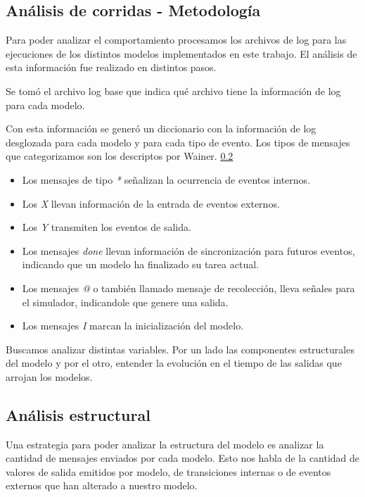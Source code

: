 
\subsection{Análisis de corridas - Metodología}

Para poder analizar el comportamiento procesamos los archivos de log para las ejecuciones de los distintos modelos implementados en este trabajo.
El análisis de esta información fue realizado en distintos pasos.

Se tomó el archivo log base que indica qué archivo tiene la información de log para cada modelo.

Con esta información se generó un diccionario con la información de log desglozada para cada modelo y para cada tipo de evento. Los tipos de mensajes que categorizamos son los descriptos por Wainer. \ref{}

\begin{itemize}
    \item Los mensajes de tipo \textit{*} señalizan la ocurrencia de eventos internos.
    \item Los \textit{X} llevan información de la entrada de eventos externos.
    \item Los \textit{Y} transmiten los eventos de salida.
    \item Los mensajes \textit{done} llevan información de sincronización para futuros eventos, indicando que un modelo ha finalizado su tarea actual.
    \item Los mensajes  \textit{@} o también llamado mensaje de recolección,
        lleva señales para el simulador, indicandole que genere una salida.
    \item Los mensajes \textit{I} marcan la inicialización del modelo.
\end{itemize}

Buscamos analizar distintas variables. Por un lado las componentes
estructurales del modelo y por el otro, entender la evolución en el tiempo de
las salidas que arrojan los modelos.

\subsection{Análisis estructural}
Una estrategia para poder analizar la estructura del modelo es analizar la
cantidad de mensajes enviados por cada modelo. Esto nos habla de la cantidad de
valores de salida emitidos por modelo, de transiciones internas o de eventos
externos que han alterado a nuestro modelo.

